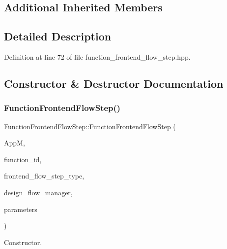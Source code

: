 \subsection*{Additional Inherited Members}


\subsection{Detailed Description}


Definition at line 72 of file function\+\_\+frontend\+\_\+flow\+\_\+step.\+hpp.



\subsection{Constructor \& Destructor Documentation}
\mbox{\label{classFunctionFrontendFlowStep_a468b4735cbda0052511a1f9a1d02f32b}} 
\subsubsection{\texorpdfstring{Function\+Frontend\+Flow\+Step()}{FunctionFrontendFlowStep()}}
{\footnotesize\ttfamily Function\+Frontend\+Flow\+Step\+::\+Function\+Frontend\+Flow\+Step (\begin{DoxyParamCaption}\item[{const \hyperlink{application__manager_8hpp_a04ccad4e5ee401e8934306672082c180}{application\+\_\+manager\+Ref}}]{AppM,  }\item[{const unsigned int}]{function\+\_\+id,  }\item[{const \hyperlink{frontend__flow__step_8hpp_afeb3716c693d2b2e4ed3e6d04c3b63bb}{Frontend\+Flow\+Step\+Type}}]{frontend\+\_\+flow\+\_\+step\+\_\+type,  }\item[{const Design\+Flow\+Manager\+Const\+Ref}]{design\+\_\+flow\+\_\+manager,  }\item[{const \hyperlink{Parameter_8hpp_a37841774a6fcb479b597fdf8955eb4ea}{Parameter\+Const\+Ref}}]{parameters }\end{DoxyParamCaption})}



Constructor. 


